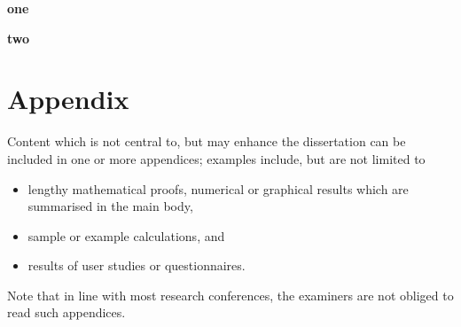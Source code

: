 \documentclass[ %
                    author={Louis Wang},
                supervisor={Dr. Qiang Liu},
                    degree={MSc},
                     title={Identification of Suicide Ideation in Texts},
                      type={},
                      year={2024}]{dissertation}
\begin{document}
\noindent

\textbf{one}

\textbf{two}



%
%

\backmatter





\appendix

\chapter{Appendix}
\label{appx:example}

Content which is not central to, but may enhance the dissertation can be 
included in one or more appendices; examples include, but are not limited
to

\begin{itemize}
\item lengthy mathematical proofs, numerical or graphical results which 
      are summarised in the main body,
\item sample or example calculations, 
      and
\item results of user studies or questionnaires.
\end{itemize}

\noindent
Note that in line with most research conferences, the examiners are not
obliged to read such appendices.

\end{document}
